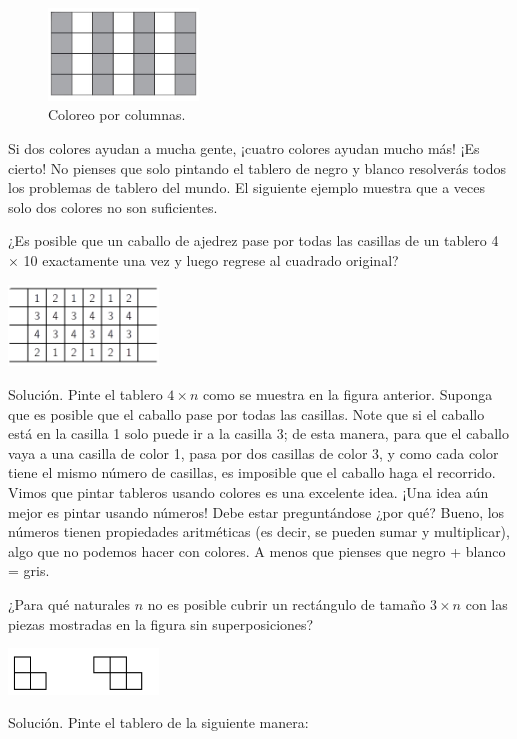 \documentclass[11pt]{scrartcl}
\begin{document}
\begin{figure}[h]
    \centering
    \includegraphics[width=4cm]{images/clase_combi_centro_09_ele_solucion.png}
    \caption{Coloreo por columnas.}
\end{figure}

Si dos colores ayudan a mucha gente, ¡cuatro colores ayudan mucho más! ¡Es cierto! No pienses que solo pintando el tablero de negro y blanco resolverás todos los problemas de tablero del mundo. El siguiente ejemplo muestra que a veces solo dos colores no son suficientes.

\begin{example}
    ¿Es posible que un caballo de ajedrez pase por todas las casillas de un tablero 4 $\times$ 10 exactamente una vez y luego regrese al cuadrado original?
\end{example}
    \begin{center}
        \includegraphics[width=4cm]{images/clase_combi_centro_09_problema_4.png}
    \end{center}
Solución. Pinte el tablero $4 \times n$ como se muestra en la figura anterior. Suponga que es posible que el caballo pase por todas las casillas. Note que si el caballo está en la casilla 1 solo puede ir a la casilla 3; de esta manera, para que el caballo vaya a una casilla de color 1, pasa por dos casillas de color 3, y como cada color tiene el mismo número de casillas, es imposible que el caballo haga el recorrido.\\

Vimos que pintar tableros usando colores es una excelente idea. ¡Una idea aún mejor es pintar usando números! Debe estar preguntándose ¿por qué? Bueno, los números tienen propiedades aritméticas (es decir, se pueden sumar y multiplicar), algo que no podemos hacer con colores. A menos que pienses que negro + blanco = gris.

\begin{example}[Estonia 1993]
    ¿Para qué naturales \(n\) no es posible cubrir un rectángulo de tamaño $3 \times n$ con las piezas mostradas en la figura sin superposiciones?
\begin{center}
    \includegraphics[width=4cm]{images/clase_combi_centro_09_problema_5.png}
\end{center}
\end{example}
Solución. Pinte el tablero de la siguiente manera:
\end{document}
